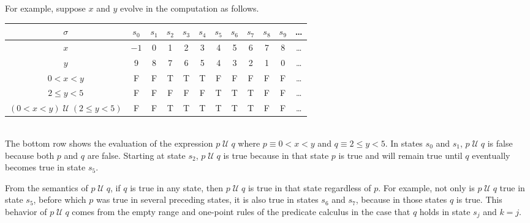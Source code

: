 \documentclass[12pt, fleqn, leqno]{article}
\newcommand{\lllgap}{12pt}                          %
\newcommand{\Until}{\;\mathcal{U}\;}
\begin{document}
For example, suppose $x$ and $y$ evolve in the computation as follows.\\[\lllgap]
\begin{tabular}{c|ccccccccccc}
  $\sigma$                  & $s_0$ & $s_1$ & $s_2$ & $s_3$ & $s_4$ & $s_5$ & $s_6$ & $s_7$ & $s_8$ & $s_9$ & \dots \\
  \hline
  $x$                       & $-1$  & 0     & 1     & 2     & 3     & 4     & 5     &  6    &  7    &  8    &  \dots\\
  $y$                       & 9     & 8     & 7     & 6     & 5     & 4     & 3     &  2    &  1    &  0    &  \dots\\
  $0<x<y$                   & F     & F     & T     & T     & T     & F     & F     &  F    &  F    &  F    &  \dots\\
  $2\le y<5$                & F     & F     & F     & F     & F     & T     & T     &  T    &  F    &  F    &  \dots\\
  $(0<x<y)\Until(2\le y<5)$ & F     & F     & T     & T     & T     & T     & T     &  T    &  F    &  F    &  \dots
\end{tabular}\\[\lllgap]
The bottom row shows the evaluation of the expression $p\Until q$ where $p\equiv 0<x<y$ and $q\equiv 2\le y<5$.
In states $s_0$ and $s_1$, $p\Until q$ is false because both $p$ and $q$ are false.
Starting at state $s_2$, $p\Until q$ is true because in that state $p$ is true and will remain true until $q$
eventually becomes true in state $s_5$.

From the semantics of $p\Until q$, if $q$ is true in any state, then $p\Until q$ is true in that state regardless of $p$.
For example, not only is $p\Until q$ true in state $s_5$, before which $p$ was true in several preceding states,
it is also true in states $s_6$ and $s_7$, because in those states $q$ is true.
This behavior of $p\Until q$ comes from the empty range and one-point rules \cite{LADM} of the predicate calculus in the case that
$q$ holds in state $s_j$ and $k=j$.
\end{document}
